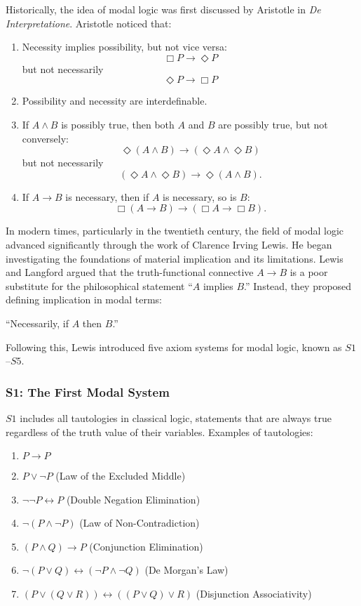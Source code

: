 \documentclass[12pt,a4paper,openany]{article}
\begin{document}
Historically, the idea of modal logic was first discussed by Aristotle in \textit{De Interpretatione}. Aristotle noticed that:

\begin{enumerate}
    \item Necessity implies possibility, but not vice versa:
    $$\Box P \to \Diamond P$$
    but not necessarily
    $$\Diamond P \to \Box P$$
    
    \item Possibility and necessity are interdefinable.
    
    \item If $A \wedge B$ is possibly true, then both $A$ and $B$ are possibly true, but not conversely:
    $$\Diamond (A \wedge B) \to (\Diamond A \wedge \Diamond B)$$
    but not necessarily
    $$(\Diamond A \wedge \Diamond B) \to \Diamond (A \wedge B).$$
    
    \item If $A \to B$ is necessary, then if $A$ is necessary, so is $B$:
    $$\Box (A \to B) \to (\Box A \to \Box B).$$
\end{enumerate}

In modern times, particularly in the twentieth century, the field of modal logic advanced significantly through the work of Clarence Irving Lewis. He began investigating the foundations of material implication and its limitations. Lewis and Langford argued that the truth-functional connective $A \to B$ is a poor substitute for the philosophical statement ``$A$ implies $B$.'' Instead, they proposed defining implication in modal terms:

``Necessarily, if $A$ then $B$.''

Following this, Lewis introduced five axiom systems for modal logic, known as $S1$--$S5$.

\subsubsection{S1: The First Modal System}

$S1$ includes all tautologies in classical logic, statements that are always true regardless of the truth value of their variables. Examples of tautologies:

\begin{enumerate}
    \item $P \to P$
    \item $P \lor \lnot P$ (Law of the Excluded Middle)
    \item $\lnot \lnot P \leftrightarrow P$ (Double Negation Elimination)
    \item $\lnot (P \land \lnot P)$ (Law of Non-Contradiction)
    \item $(P \land Q) \to P$ (Conjunction Elimination)
    \item $\lnot (P \lor Q) \leftrightarrow (\lnot P \land \lnot Q)$ (De Morgan's Law)
    \item $(P \lor (Q \lor R)) \leftrightarrow ((P \lor Q) \lor R)$ (Disjunction Associativity)
\end{enumerate}
\end{document}
